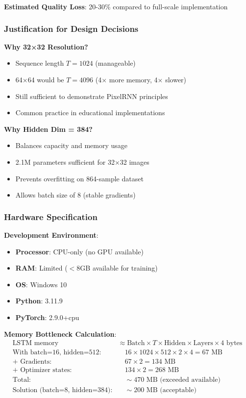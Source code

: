 \documentclass[12pt,a4paper]{article}
\begin{document}
\textbf{Estimated Quality Loss}: 20-30\% compared to full-scale implementation

\subsubsection{Justification for Design Decisions}

\textbf{Why 32×32 Resolution?}
\begin{itemize}
    \item Sequence length $T = 1024$ (manageable)
    \item 64×64 would be $T = 4096$ (4× more memory, 4× slower)
    \item Still sufficient to demonstrate PixelRNN principles
    \item Common practice in educational implementations
\end{itemize}

\textbf{Why Hidden Dim = 384?}
\begin{itemize}
    \item Balances capacity and memory usage
    \item 2.1M parameters sufficient for 32×32 images
    \item Prevents overfitting on 864-sample dataset
    \item Allows batch size of 8 (stable gradients)
\end{itemize}

\subsubsection{Hardware Specification}

\textbf{Development Environment}:
\begin{itemize}
    \item \textbf{Processor}: CPU-only (no GPU available)
    \item \textbf{RAM}: Limited ($<$8GB available for training)
    \item \textbf{OS}: Windows 10
    \item \textbf{Python}: 3.11.9
    \item \textbf{PyTorch}: 2.9.0+cpu
\end{itemize}

\textbf{Memory Bottleneck Calculation}:
\begin{align*}
\text{LSTM memory} &\approx \text{Batch} \times T \times \text{Hidden} \times \text{Layers} \times 4 \text{ bytes} \\
\text{With batch=16, hidden=512:} &\quad 16 \times 1024 \times 512 \times 2 \times 4 = 67 \text{ MB} \\
\text{+ Gradients:} &\quad 67 \times 2 = 134 \text{ MB} \\
\text{+ Optimizer states:} &\quad 134 \times 2 = 268 \text{ MB} \\
\text{Total:} &\quad \sim 470 \text{ MB (exceeded available)} \\
\text{Solution (batch=8, hidden=384):} &\quad \sim 200 \text{ MB (acceptable)}
\end{align*}
\end{document}
